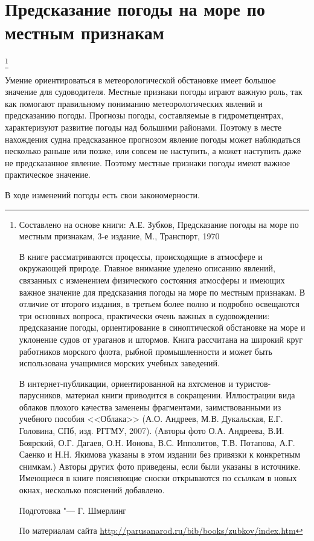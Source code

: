 \section{Предсказание погоды на море по местным признакам}\footnote{
Составлено на основе книги: А.Е. Зубков, Предсказание погоды на море
по местным признакам, 3-е издание, М., Транспорт, 1970

В книге рассматриваются процессы, происходящие в атмосфере и
окружающей природе. Главное внимание уделено описанию явлений,
связанных с изменением физического состояния атмосферы и имеющих
важное значение для предсказания погоды на море по местным
признакам. В отличие от второго издания, в третьем более полно и
подробно освещаются три основных вопроса, практически очень важных в
судовождении: предсказание погоды, ориентирование в синоптической
обстановке на море и уклонение судов от ураганов и штормов. Книга
рассчитана на широкий круг работников морского флота, рыбной
промышленности и может быть использована учащимися морских учебных
заведений.

В интернет-публикации, ориентированной на яхтсменов и
туристов-парусников, материал книги приводится в
сокращении. Иллюстрации вида облаков плохого качества заменены
фрагментами, заимствованными из учебного пособия <<Облака>>
(А.О. Андреев, М.В. Дукальская, Е.Г. Головина, СПб, изд. РГГМУ,
2007). (Авторы фото О.А. Андреева, В.И. Боярский, О.Г. Дагаев,
О.Н. Ионова, В.С. Ипполитов, Т.В. Потапова, А.Г. Саенко и Н.Н. Якимова
указаны в этом издании без привязки к конкретным снимкам.) Авторы
других фото приведены, если были указаны в источнике. Имеющиеся в
книге поясняющие сноски открываются по ссылкам в новых окнах,
несколько пояснений добавлено.

Подготовка "--- Г. Шмерлинг

По материалам сайта \url{http://parusanarod.ru/bib/books/zubkov/index.htm}}

Умение ориентироваться в метеорологической обстановке имеет большое
значение для судоводителя. Местные признаки погоды играют важную роль,
так как помогают правильному пониманию метеорологических явлений и
предсказанию погоды. Прогнозы погоды, составляемые в гидрометцентрах,
характеризуют развитие погоды над большими районами. Поэтому в месте
нахождения судна предсказанное прогнозом явление погоды может
наблюдаться несколько раньше или позже, или совсем не наступить, а
может наступить даже не предсказанное явление. Поэтому местные
признаки погоды имеют важное практическое значение.

В ходе изменений погоды есть свои закономерности.

